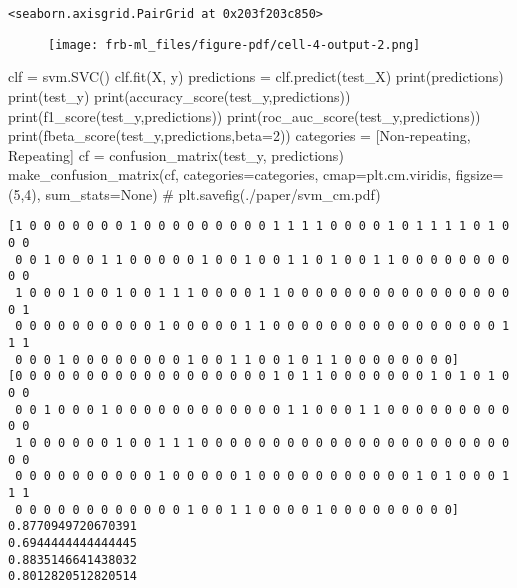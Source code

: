\documentclass[
  letterpaper,
  DIV=11,
  numbers=noendperiod]{scrartcl}
\newenvironment{Shaded}{\begin{snugshade}}{\end{snugshade}}
\newcommand{\BuiltInTok}[1]{\textcolor[rgb]{0.00,0.23,0.31}{#1}}
\newcommand{\CommentTok}[1]{\textcolor[rgb]{0.37,0.37,0.37}{#1}}
\newcommand{\DecValTok}[1]{\textcolor[rgb]{0.68,0.00,0.00}{#1}}
\newcommand{\NormalTok}[1]{\textcolor[rgb]{0.00,0.23,0.31}{#1}}
\newcommand{\OperatorTok}[1]{\textcolor[rgb]{0.37,0.37,0.37}{#1}}
\newcommand{\StringTok}[1]{\textcolor[rgb]{0.13,0.47,0.30}{#1}}
\newcommand{\VariableTok}[1]{\textcolor[rgb]{0.07,0.07,0.07}{#1}}
\begin{document}
\begin{verbatim}
<seaborn.axisgrid.PairGrid at 0x203f203c850>
\end{verbatim}

\begin{figure}[H]

{\centering \texttt{[image: frb-ml\_files/figure-pdf/cell-4-output-2.png]}

}

\end{figure}

\begin{Shaded}
\begin{Highlighting}[]
\NormalTok{clf }\OperatorTok{=}\NormalTok{ svm.SVC()}
\NormalTok{clf.fit(X, y)}
\NormalTok{predictions }\OperatorTok{=}\NormalTok{ clf.predict(test\_X)}
\BuiltInTok{print}\NormalTok{(predictions)}
\BuiltInTok{print}\NormalTok{(test\_y)}
\BuiltInTok{print}\NormalTok{(accuracy\_score(test\_y,predictions))}
\BuiltInTok{print}\NormalTok{(f1\_score(test\_y,predictions))}
\BuiltInTok{print}\NormalTok{(roc\_auc\_score(test\_y,predictions))}
\BuiltInTok{print}\NormalTok{(fbeta\_score(test\_y,predictions,beta}\OperatorTok{=}\DecValTok{2}\NormalTok{))}
\NormalTok{categories }\OperatorTok{=}\NormalTok{ [}\StringTok{\textquotesingle{}Non{-}repeating\textquotesingle{}}\NormalTok{, }\StringTok{\textquotesingle{}Repeating\textquotesingle{}}\NormalTok{]}
\NormalTok{cf }\OperatorTok{=}\NormalTok{ confusion\_matrix(test\_y, predictions)}
\NormalTok{make\_confusion\_matrix(cf, }
\NormalTok{                      categories}\OperatorTok{=}\NormalTok{categories,}
\NormalTok{                      cmap}\OperatorTok{=}\NormalTok{plt.cm.viridis,}
\NormalTok{                      figsize}\OperatorTok{=}\NormalTok{(}\DecValTok{5}\NormalTok{,}\DecValTok{4}\NormalTok{),}
\NormalTok{                      sum\_stats}\OperatorTok{=}\VariableTok{None}\NormalTok{)}
\CommentTok{\# plt.savefig(\textquotesingle{}./paper/svm\_cm.pdf\textquotesingle{})}
\end{Highlighting}
\end{Shaded}

\begin{verbatim}
[1 0 0 0 0 0 0 0 1 0 0 0 0 0 0 0 0 0 1 1 1 1 0 0 0 0 1 0 1 1 1 1 0 1 0 0 0
 0 0 1 0 0 0 1 1 0 0 0 0 0 1 0 0 1 0 0 1 1 0 1 0 0 1 1 0 0 0 0 0 0 0 0 0 0
 1 0 0 0 1 0 0 1 0 0 1 1 1 0 0 0 0 1 1 0 0 0 0 0 0 0 0 0 0 0 0 0 0 0 0 0 1
 0 0 0 0 0 0 0 0 0 0 1 0 0 0 0 0 1 1 0 0 0 0 0 0 0 0 0 0 0 0 0 0 0 0 1 1 1
 0 0 0 1 0 0 0 0 0 0 0 0 1 0 0 1 1 0 0 1 0 1 1 0 0 0 0 0 0 0 0]
[0 0 0 0 0 0 0 0 0 0 0 0 0 0 0 0 0 0 1 0 1 1 0 0 0 0 0 0 0 1 0 1 0 1 0 0 0
 0 0 1 0 0 0 1 0 0 0 0 0 0 0 0 0 0 0 0 1 1 0 0 0 1 1 0 0 0 0 0 0 0 0 0 0 0
 1 0 0 0 0 0 0 1 0 0 1 1 1 0 0 0 0 0 0 0 0 0 0 0 0 0 0 0 0 0 0 0 0 0 0 0 0
 0 0 0 0 0 0 0 0 0 0 1 0 0 0 0 0 1 0 0 0 0 0 0 0 0 0 0 0 1 0 1 0 0 0 1 1 1
 0 0 0 0 0 0 0 0 0 0 0 0 1 0 0 1 1 0 0 0 0 1 0 0 0 0 0 0 0 0 0]
0.8770949720670391
0.6944444444444445
0.8835146641438032
0.8012820512820514
\end{verbatim}
\end{document}

